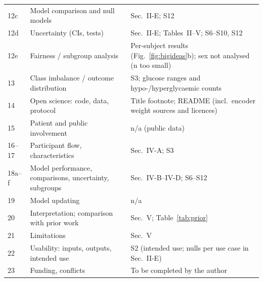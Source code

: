 \documentclass[journal,onecolumn]{IEEEtran}
\begin{document}
\begin{longtable}{@{}p{1.2cm}p{7.2cm}p{6.5cm}@{}}
12c & Model comparison and null models & Sec.~II-E; S12 \\
12d & Uncertainty (CIs, tests) & Sec.~II-E; Tables~II--V; S6--S10, S12 \\
12e & Fairness / subgroup analysis & Per-subject results (Fig.~\ref{fig:bigideas}b); sex not analysed (n too small) \\
13 & Class imbalance / outcome distribution & S3; glucose ranges and hypo-/hyperglycaemic counts \\
14 & Open science: code, data, protocol & Title footnote; README (incl.\ encoder weight sources and licences) \\
15 & Patient and public involvement & n/a (public data) \\
16--17 & Participant flow, characteristics & Sec.~IV-A; S3 \\
18a--f & Model performance, comparisons, uncertainty, subgroups & Sec.~IV-B--IV-D; S6--S12 \\
19 & Model updating & n/a \\
20 & Interpretation; comparison with prior work & Sec.~V; Table~\ref{tab:prior} \\
21 & Limitations & Sec.~V \\
22 & Usability: inputs, outputs, intended use & S2 (intended use; nulls per use case in Sec.~II-E) \\
23 & Funding, conflicts & To be completed by the author \\
\bottomrule
\end{longtable}
\end{document}
